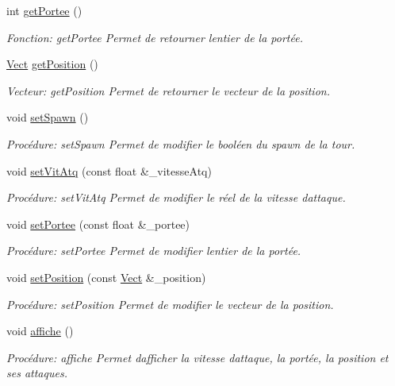 \begin{DoxyCompactItemize}
int \hyperlink{classTour_a4c0b40ef85678f12cc7a3e78588094e8}{get\+Portee} ()
\begin{DoxyCompactList}\small\item\em Fonction\+: get\+Portee Permet de retourner l\textquotesingle{}entier de la portée. \end{DoxyCompactList}\item 
\hyperlink{classVect}{Vect} \hyperlink{classTour_a2283f61d6b088bf41c53c882f4a72864}{get\+Position} ()
\begin{DoxyCompactList}\small\item\em Vecteur\+: get\+Position Permet de retourner le vecteur de la position. \end{DoxyCompactList}\item 
void \hyperlink{classTour_ae14b537e1e6fcfef00eadfd0d6d29e46}{set\+Spawn} ()
\begin{DoxyCompactList}\small\item\em Procédure\+: set\+Spawn Permet de modifier le booléen du spawn de la tour. \end{DoxyCompactList}\item 
void \hyperlink{classTour_a110c73fc4160189cdafbb700f3999a39}{set\+Vit\+Atq} (const float \&\+\_\+vitesse\+Atq)
\begin{DoxyCompactList}\small\item\em Procédure\+: set\+Vit\+Atq Permet de modifier le réel de la vitesse d\textquotesingle{}attaque. \end{DoxyCompactList}\item 
void \hyperlink{classTour_a7f9a17a8138ebd8afe72520d7d8a18db}{set\+Portee} (const float \&\+\_\+portee)
\begin{DoxyCompactList}\small\item\em Procédure\+: set\+Portee Permet de modifier l\textquotesingle{}entier de la portée. \end{DoxyCompactList}\item 
void \hyperlink{classTour_a1db07b7ed15a7b0d11e96bb67831feba}{set\+Position} (const \hyperlink{classVect}{Vect} \&\+\_\+position)
\begin{DoxyCompactList}\small\item\em Procédure\+: set\+Position Permet de modifier le vecteur de la position. \end{DoxyCompactList}\item 
void \hyperlink{classTour_a418908de2fcbb83e8e9459a999f98aa6}{affiche} ()
\begin{DoxyCompactList}\small\item\em Procédure\+: affiche Permet d\textquotesingle{}afficher la vitesse d\textquotesingle{}attaque, la portée, la position et ses attaques. \end{DoxyCompactList}\item 

\end{DoxyCompactItemize}
